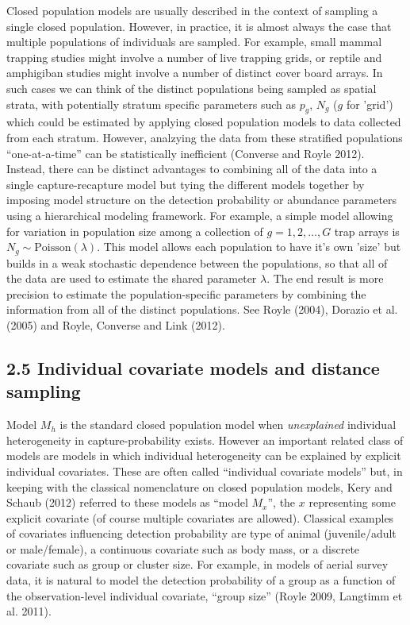\documentclass{book}
\begin{document}
Closed population models are usually described in the context of
sampling a single closed population. However, in practice, it is
almost always the case that multiple populations of individuals are
sampled. For example, small mammal trapping studies might involve a
number of live trapping grids, or reptile and amphigiban studies might
involve a number of distinct cover board arrays.  In such cases we can
think of the distinct populations being sampled as spatial strata,
with potentially stratum specific parameters such as $p_{g}$, $N_{g}$
($g$ for 'grid') which could be estimated by applying closed
population models to data collected from each stratum.  However,
analzying the data from these stratified populations ``one-at-a-time''
can be statistically inefficient (Converse and Royle 2012). Instead,
there can be distinct advantages to combining all of the data into a
single capture-recapture model but tying the different models together
by imposing model structure on the detection probability or abundance
parameters using a hierarchical modeling framework.  For example, a
simple model allowing for variation in population size among a
collection of $g=1,2,\ldots,G$ trap arrays is $N_{g} \sim
\mbox{Poisson}(\lambda)$. This model allows each population to have
it's own 'size' but builds in a weak stochastic dependence between the
populations, so that all of the data are used to estimate the shared
parameter $\lambda$. The end result is more precision to estimate the
population-specific parameters by combining the information from all
of the distinct populations. See Royle (2004), Dorazio et al. (2005)
and Royle, Converse and Link (2012).


\subsection*{2.5 Individual covariate models and distance sampling}

Model $M_h$ is the standard closed population model when {\it
  unexplained} individual heterogeneity in capture-probability
exists. However an important related class of models are models in
which individual heterogeneity can be explained by explicit individual
covariates. These are often called ``individual covariate models''
but, in keeping with the classical nomenclature on closed population
models, Kery and Schaub (2012) referred to these models as ``model
$M_{x}$'', the $x$ representing some explicit covariate (of course
multiple covariates are allowed).  Classical examples of covariates
influencing detection probability are type of animal (juvenile/adult
or male/female), a continuous covariate such as body mass, or a
discrete covariate such as group or cluster size. For example, in
models of aerial survey data, it is natural to model the detection
probability of a group as a function of the observation-level
individual covariate, ``group size'' (Royle 2009, Langtimm et
al. 2011).
\end{document}
